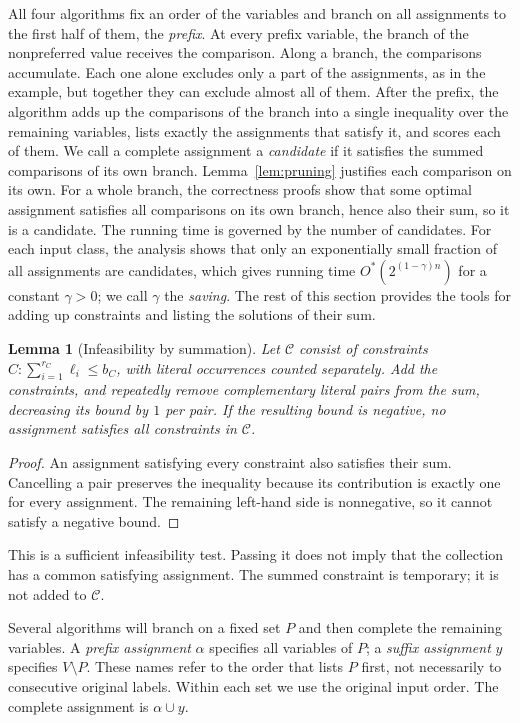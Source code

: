 \documentclass[11pt,a4paper]{article}
\newtheorem{lemma}[theorem]{Lemma}
\theoremstyle{definition}
\theoremstyle{remark}
\newcommand{\Ostar}{O^{*}}
\begin{document}
All four algorithms fix an order of the variables and branch on all
assignments to the first half of them, the \emph{prefix}. At every prefix
variable, the branch of the nonpreferred value receives the comparison.
Along a branch, the comparisons accumulate. Each one alone excludes only a
part of the assignments, as in the example, but together they can exclude
almost all of them. After the prefix, the algorithm adds up the comparisons
of the branch into a single inequality over the remaining variables, lists
exactly the assignments that satisfy it, and scores each of them. We call a
complete assignment a \emph{candidate} if it satisfies the summed
comparisons of its own branch. Lemma~\ref{lem:pruning} justifies each
comparison on its own. For a whole branch, the correctness proofs show that
some optimal assignment satisfies all comparisons on its own branch, hence
also their sum, so it is a candidate. The running time is governed by the
number of candidates. For each input class, the analysis shows that only an
exponentially small fraction of all assignments are candidates, which gives
running time $\Ostar(2^{(1-\gamma)n})$ for a constant $\gamma>0$; we call
$\gamma$ the \emph{saving}. The rest of this section provides the tools for
adding up constraints and listing the solutions of their sum.

\begin{lemma}[Infeasibility by summation]\label{lem:constraint_sum}
Let $\mathcal C$ consist of constraints $C:\sum_{i=1}^{r_C}\ell_i\le b_C$,
with literal occurrences counted separately. Add the constraints, and
repeatedly remove complementary literal pairs from the sum, decreasing
its bound by $1$ per pair. If the resulting bound is negative, no
assignment satisfies all constraints in $\mathcal C$.
\end{lemma}
\begin{proof}
An assignment satisfying every constraint also satisfies their sum.
Cancelling a pair preserves the inequality because its contribution is
exactly one for every assignment. The remaining left-hand side is
nonnegative, so it cannot satisfy a negative bound.
\end{proof}

This is a sufficient infeasibility test. Passing it does not imply that
the collection has a common satisfying assignment. The summed constraint
is temporary; it is not added to $\mathcal C$.

Several algorithms will branch on a fixed set $P$ and then complete the
remaining variables. A \emph{prefix assignment} $\alpha$ specifies all
variables of $P$; a \emph{suffix assignment} $y$ specifies $V\setminus P$.
These names refer to the order that lists $P$ first, not necessarily to
consecutive original labels. Within each set we use the original input
order. The complete assignment is $\alpha\cup y$.
\end{document}
